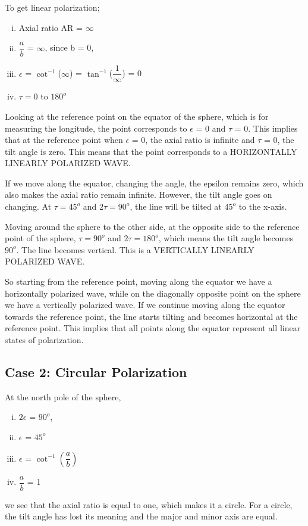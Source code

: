 To get linear polarization;
\begin{enumerate}[(i)]
\item Axial ratio AR = $\infty$
\item $\dfrac{a}{b}$ = $\infty$, since b = 0,
\item $\epsilon$ = $\cot^{-1}$($\infty$) = $\tan^{-1}$($\dfrac{1}{\infty}$) = 0
\item $\tau = 0  $ to $  180^{o} $
\end{enumerate}
Looking at the reference point on the equator of the sphere, which is for measuring the longitude, the point corresponds to $\epsilon$ = 0 and $\tau$ = 0. This implies that at the reference point when $\epsilon$ = 0, the axial ratio is infinite and $\tau$ = 0, the tilt angle is zero. This means that the point corresponds to a HORIZONTALLY LINEARLY POLARIZED WAVE.

If we move along the equator, changing the angle, the epsilon remains zero, which also makes the axial ratio remain infinite. However, the tilt angle goes on changing. At $\tau = 45^{o}$ and $2\tau = 90^{o}$, the line will be tilted at $45^{o}$ to the x-axis.

Moving around the sphere to the other side, at the opposite side to the reference point of the sphere, $\tau = 90^{o}$ and $2\tau = 180^{o}$, which means the tilt angle becomes $90^{o}$. The line becomes vertical. This is a VERTICALLY LINEARLY POLARIZED WAVE. 

So starting from the reference point, moving along the equator we have a horizontally polarized wave, while on the diagonally opposite point on the sphere we have a vertically polarized wave. If we continue moving along the equator towards the reference point, the line starts tilting and becomes horizontal at the reference point. This implies that all points along the equator represent all linear states of polarization.

\subsection{Case 2: Circular Polarization}
At the north pole of the sphere,
\begin{enumerate}[(i)]
\item 	$2\epsilon$ = $90^{o}$, 
\item	$\epsilon$ = $45^{o}$
\item	$\epsilon$ = $\cot^{-1}(\dfrac{a}{b})$
\item	$\dfrac{a}{b}$ = 1
\end{enumerate}
we see that the axial ratio is equal to one, which makes it a circle. For a circle, the tilt angle has lost its meaning and the major and minor axis are equal.

